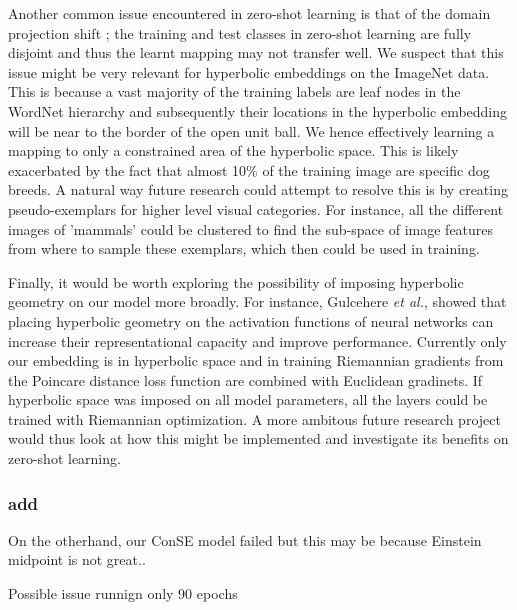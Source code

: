 \documentclass[12pt]{report}
\begin{document}
Another common issue encountered in zero-shot learning is that of the domain projection shift \cite{Fu2015}; the training and test classes in zero-shot learning are fully disjoint and thus the learnt mapping may not transfer well. We suspect that this issue might be very relevant for hyperbolic embeddings on the ImageNet data. This is because a vast majority of the training labels are leaf nodes in the WordNet hierarchy and subsequently their locations in the hyperbolic embedding will be near to the border of the open unit ball. We hence effectively learning a mapping to only a constrained area of the hyperbolic space. This is likely exacerbated by the fact that almost 10\% \cite{Peterson2018} of the training image are specific dog breeds. A natural way future research could attempt to resolve this is by creating pseudo-exemplars for higher level visual categories. For instance, all the different images of 'mammals' could be clustered to find the sub-space of image features from where to sample these exemplars, which then could be used in training.

Finally, it would be worth exploring the possibility of imposing hyperbolic geometry on our model more broadly. For instance, Gulcehere \textit{et al.}, showed that placing hyperbolic geometry on the activation functions of neural networks can increase their representational capacity and improve performance. Currently only our embedding is in hyperbolic space and in training Riemannian gradients from the Poincare distance loss function are combined with Euclidean gradinets. If hyperbolic space was imposed on all model parameters, all the layers could be trained with Riemannian optimization. A more ambitous future research project would thus look at how this might be implemented and investigate its benefits on zero-shot learning.



\subsubsection{add}

On the otherhand, our ConSE model failed but this may be because Einstein midpoint is not great..

Possible issue runnign only 90 epochs



\end{document}
